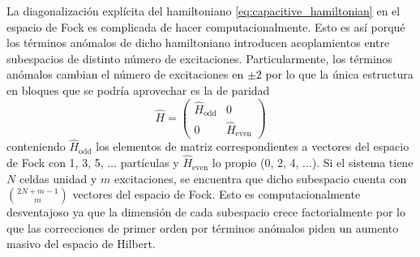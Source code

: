 La diagonalización explícita del hamiltoniano \eqref{eq:capacitive_hamiltonian} en el espacio de Fock es complicada de hacer computacionalmente. Esto es así porqué los términos anómalos de dicho hamiltoniano introducen acoplamientos entre subespacios de distinto número de excitaciones. Particularmente, los términos anómalos cambian el número de excitaciones en $\pm 2$ por lo que la única estructura en bloques que se podría aprovechar es la de paridad
\begin{equation}
    \hat H = \begin{pmatrix}
        \hat H_{\text{odd}} & 0 \\
        0 & \hat H_{\text{even}}
    \end{pmatrix}
\end{equation}
conteniendo $\hat H_{\text{odd}}$ los elementos de matriz correspondientes a vectores del espacio de Fock con 1, 3, 5, $\ldots$ partículas y $\hat H_{\text{even}}$ lo propio (0, 2, 4, $\ldots$). Si el sistema tiene $N$ celdas unidad y $m$ excitaciones, se encuentra que dicho subespacio cuenta con ${2N + m - 1}\choose{m}$ vectores del espacio de Fock. Esto es computacionalmente desventajoso ya que la dimensión de cada subespacio crece factorialmente por lo que las correcciones de primer orden por términos anómalos piden un aumento masivo del espacio de Hilbert.\\~\\

